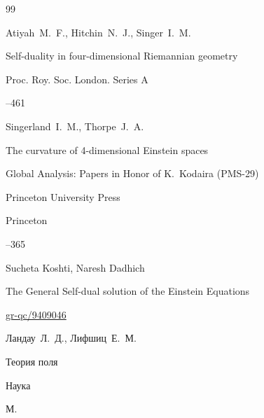 \begin{thebibliography}{99}

\by Atiyah~M.~F., Hitchin~N.~J., Singer~I.~M.

\paper Self-duality in four-dimensional Riemannian geometry

\jour Proc. Roy. Soc. London. Series A




–461











\by Singerland~I.~M., Thorpe~J.~A.

\paper The curvature of 4-dimensional Einstein spaces

\inbook Global Analysis: Papers in Honor of K.~Kodaira \rm (PMS-29)

\publ Princeton University Press

\publaddr Princeton 


–365





\by Sucheta Koshti, Naresh Dadhich

\preprint The General Self-dual solution of the Einstein Equations


\arxiv \href{https://arxiv.org/abs/gr-qc/9409046}{gr-qc/9409046}






\by Ландау~Л.~Д., Лифшиц~Е.~М.

\book Теория поля


\publ Наука

\publaddr М.







\end{thebibliography}
